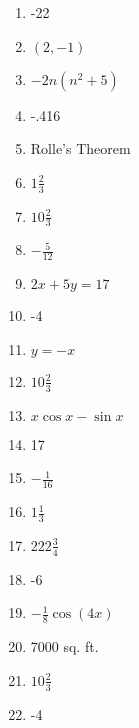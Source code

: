 \documentclass[../uilmath.tex]{subfiles}
\begin{document}
\begin{enumerate}[label=\bfseries\arabic*.]
    \item %
    -22

    \item %
    $(2,-1)$

    \item %
    $-2n(n^2+5)$

    \item %
    -.416

    \item %
    Rolle's Theorem 

    \item %
    $1\frac{2}{3}$

    \item %
    $10\frac{2}{3}$

    \item %
    $-\frac{5}{12}$

    \item %
    $2x+5y=17$

    \item %
    -4

    \item %
    $y=-x$

    \item %
    $10\frac{2}{3}$

    \item %
    $x\cos x-\sin x$

    \item %
    17 

    \item %
    $-\frac{1}{16}$

    \item %
    $1\frac{1}{3}$

    \item %
    $222\frac{3}{4}$

    \item %
    -6 

    \item %
    $-\frac{1}{8}\cos(4x)$

    \item %
    7000 sq. ft.

    \item %
    $10\frac{2}{3}$

    \item %
    -4


\end{enumerate}
\end{document}
